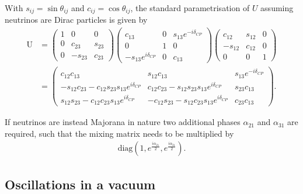 With $s_{ij}=\sin\theta_{ij}$ and $c_{ij}=\cos\theta_{ij}$, the standard parametrisation of $U$
assuming neutrinos are Dirac particles is given by
\begin{align} %
    \text{U} & =
    \begin{pmatrix}
        1 & 0       & 0      \\
        0 & c_{23}  & s_{23} \\
        0 & -s_{23} & c_{23}
    \end{pmatrix}
    \begin{pmatrix}
        c_{13}                   & 0 & s_{13}e^{-i\delta_{CP}} \\
        0                        & 1 & 0                       \\
        -s_{13}e^{i\delta_{CP}} & 0 & c_{13}
    \end{pmatrix}
    \begin{pmatrix}
        c_{12}  & s_{12} & 0 \\
        -s_{12} & c_{12} & 0 \\
        0       & 0      & 1
    \end{pmatrix}
    \label{eq:matrix}
    \\
             & =
    \begin{pmatrix}
        c_{12}c_{13}
         & s_{12}c_{13}
         & s_{13}e^{-i\delta_{CP}}                          \\
        -s_{12}c_{23}-c_{12}s_{23}s_{13}e^{i\delta_{CP}}
         & c_{12}c_{23}-s_{12}s_{23}s_{13}e^{i\delta_{CP}}
         & s_{23}c_{13}                                     \\
        s_{12}s_{23}-c_{12}c_{23}s_{13}e^{i\delta_{CP}}
         & -c_{12}s_{23}-s_{12}c_{23}s_{13}e^{i\delta_{CP}}
         & c_{23}c_{13}
    \end{pmatrix}.
\end{align} %

If neutrinos are instead Majorana in nature two additional phases $\alpha_{21}$ and $\alpha_{31}$
are required, such that the mixing matrix needs to be multiplied by
\begin{align} %
    \text{diag}(1, e^{\frac{i\alpha_{21}}{2}}, e^{\frac{i\alpha_{31}}{2}}).
\end{align}

\subsection{Oscillations in a vacuum} %
\label{sec:theory_oscillations_vacuum} %

